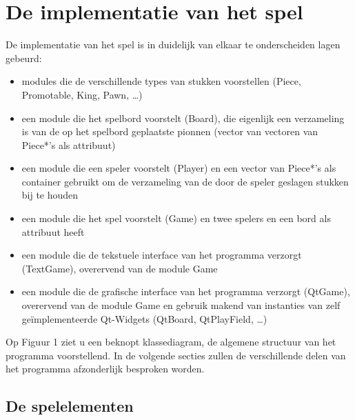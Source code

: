 \documentclass[a4paper,11pt,oneside, titlepage]{article}
\begin{document}
\section{De implementatie van het spel}
De implementatie van het spel is in duidelijk van elkaar te onderscheiden lagen gebeurd:
	\begin{itemize}
		\item modules die de verschillende types van stukken voorstellen (Piece, Promotable, King, Pawn, \ldots)
		\item een module die het spelbord voorstelt (Board), die eigenlijk een verzameling is van de op het spelbord geplaatste pionnen (vector van vectoren van Piece*'s als attribuut)
		\item een module die een speler voorstelt (Player) en een vector van Piece*'s als container gebruikt om de verzameling van de door de speler geslagen stukken bij te houden
		\item een module die het spel voorstelt (Game) en twee spelers en een bord als attribuut heeft
		\item een module die de tekstuele interface van het programma verzorgt (TextGame), overervend van de module Game
		\item een module die de grafische interface van het programma verzorgt (QtGame), overervend van de module Game en gebruik makend van instanties van zelf ge\"implementeerde Qt-Widgets (QtBoard, QtPlayField, \ldots)
	\end{itemize}
Op Figuur 1 ziet u een beknopt klassediagram, de algemene structuur van het programma voorstellend. In de volgende secties zullen de verschillende delen van het programma afzonderlijk besproken worden.
\subsection{De spelelementen}
\end{document}
